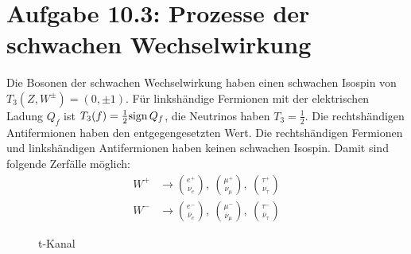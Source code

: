 \documentclass[a4paper,12pt]{article}
\newcommand{\tecxt}{}
\begin{document}
\section*{Aufgabe 10.3: Prozesse der schwachen Wechselwirkung}
Die Bosonen der schwachen Wechselwirkung haben einen schwachen Isospin von $T_3(Z,W^\pm)=(0,\pm 1)$. Für linkshändige Fermionen mit der elektrischen Ladung $Q_f$ ist $T_3(f)=\frac{1}{2}\tecxt\text{sign\,}Q_f$, die Neutrinos haben $T_3=\frac{1}{2}$. Die rechtshändigen Antifermionen haben den entgegengesetzten Wert. Die rechtshändigen Fermionen und linkshändigen Antifermionen haben keinen schwachen Isospin. Damit sind folgende Zerfälle möglich:
\begin{align*}
W^+ &\longrightarrow\binom{e^+}{\nu_e},\ \binom{\mu^+}{\nu_\mu},\ \binom{\tau^+}{\nu_\tau}\\
W^- &\longrightarrow\binom{e^-}{\overline{\nu}_e},\ \binom{\mu^-}{\overline{\nu}_\mu},\ \binom{\tau^-}{\overline{\nu}_\tau}
\end{align*}
\begin{figure}[h!]
\centering
{}
\caption{t-Kanal}
\end{figure}\,\newpage
\end{document}
